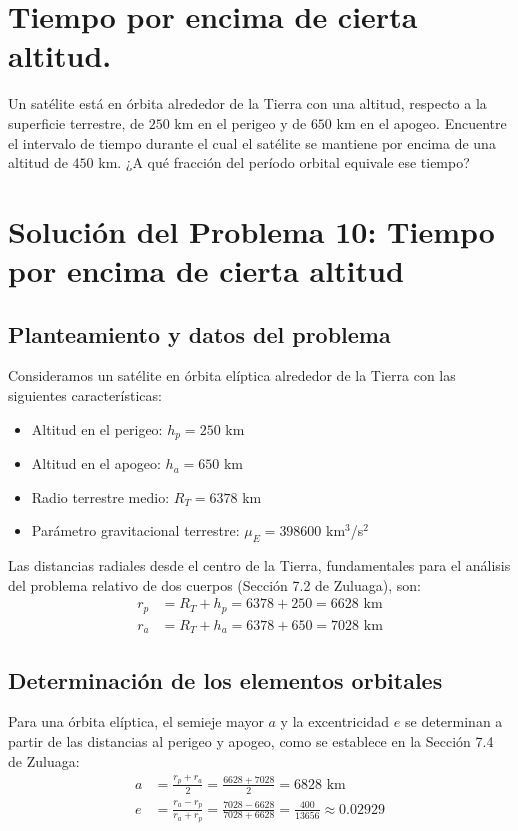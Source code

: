 \documentclass[12pt, a4paper]{article}
\begin{document}
\section{Tiempo por encima de cierta altitud.} Un satélite está en órbita alrededor de la Tierra con una altitud, respecto a la superficie terrestre, de $250$ km en el perigeo y de $650$ km en el apogeo. Encuentre el intervalo de tiempo durante el cual el satélite se mantiene por encima de una altitud de $450$ km. ¿A qué fracción del período orbital equivale ese tiempo?


\section*{Solución del Problema 10: Tiempo por encima de cierta altitud}

\subsection*{Planteamiento y datos del problema}

Consideramos un satélite en órbita elíptica alrededor de la Tierra con las siguientes características:
\begin{itemize}
    \item Altitud en el perigeo: $h_p = 250$ km
    \item Altitud en el apogeo: $h_a = 650$ km
    \item Radio terrestre medio: $R_T = 6378$ km
    \item Parámetro gravitacional terrestre: $\mu_E = 398600$ km$^3$/s$^2$
\end{itemize}

Las distancias radiales desde el centro de la Tierra, fundamentales para el análisis del problema relativo de dos cuerpos (Sección 7.2 de Zuluaga), son:
\begin{align}
    r_p &= R_T + h_p = 6378 + 250 = 6628 \text{ km} \\
    r_a &= R_T + h_a = 6378 + 650 = 7028 \text{ km}
\end{align}

\subsection*{Determinación de los elementos orbitales}

Para una órbita elíptica, el semieje mayor $a$ y la excentricidad $e$ se determinan a partir de las distancias al perigeo y apogeo, como se establece en la Sección 7.4 de Zuluaga:
\begin{align}
    a &= \frac{r_p + r_a}{2} = \frac{6628 + 7028}{2} = 6828 \text{ km} \\
    e &= \frac{r_a - r_p}{r_a + r_p} = \frac{7028 - 6628}{7028 + 6628} = \frac{400}{13656} \approx 0.02929
\end{align}
\end{document}
